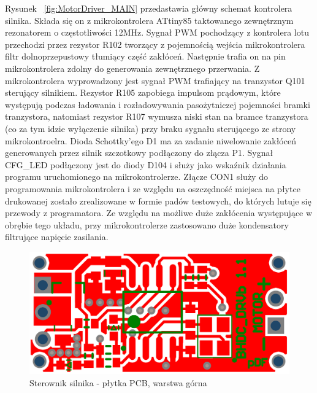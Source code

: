 Rysunek ~\ref{fig:MotorDriver_MAIN} przedastawia główny schemat kontrolera silnika. Składa się on z mikrokontrolera ATtiny85 taktowanego zewnętrznym rezonatorem o częstotliwości 12MHz. Sygnał PWM pochodzący z kontrolera lotu przechodzi przez rezystor R102 tworzący z pojemnością wejścia mikrokontrolera filtr dolnoprzepustowy tłumiący część zakłóceń. Następnie trafia on na pin mikrokontrolera zdolny do generowania zewnętrznego przerwania. Z mikrokontrolera wyprowadzony jest sygnał PWM  trafiający na tranzystor Q101 sterujący silnikiem. Rezystor R105 zapobiega impulsom prądowym, które występują podczas ładowania i rozładowywania pasożytniczej pojemności bramki tranzystora, natomiast rezystor R107 wymusza niski stan na bramce tranzystora (co za tym idzie wyłączenie silnika) przy braku sygnału sterującego ze strony mikrokontroelra. Dioda Schottky'ego D1 ma za zadanie niwelowanie zakłóceń generowanych przez silnik szczotkowy podłączony do złącza P1. Sygnał CFG\_LED podłączony jest do diody D104 i służy jako wskaźnik działania programu uruchomionego na mikrokontrolerze. Złącze CON1 służy do programowania mikrokontrolera i ze względu na oszczędność miejsca na płytce drukowanej zostało zrealizowane w formie padów testowych, do których lutuje się przewody z programatora. Ze względu na możliwe duże zakłócenia występujące w obrębie tego układu, przy mikrokontrolerze zastosowano duże kondensatory filtrujące napięcie zasilania.

\begin{figure}[H]
	\centering
	\includegraphics[scale=0.4]{Pictures/MotorDriverPCB_Top.png}
		\caption[Sterownik silnika - płytka PCB, warstrwa górna]{Sterownik silnika - płytka PCB, warstwa górna}
	\label{fig:MotorDriverPCB_Top}
\end{figure}


